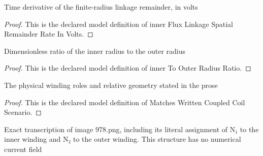 \begin{definition}
  \label{def:physics:phyx-mini-0978:phyxminiproblems-problemphyxmini0978-innerfluxlinkagespatialremainderrateinvolts}
  Time derivative of the finite-radius linkage remainder, in volts
\end{definition}
\begin{proof}
  This is the declared model definition of inner Flux Linkage Spatial Remainder Rate In Volts.
\end{proof}
\begin{definition}
  \label{def:physics:phyx-mini-0978:phyxminiproblems-problemphyxmini0978-innertoouterradiusratio}
  Dimensionless ratio of the inner radius to the outer radius
\end{definition}
\begin{proof}
  This is the declared model definition of inner To Outer Radius Ratio.
\end{proof}
\begin{definition}
  \label{def:physics:phyx-mini-0978:phyxminiproblems-problemphyxmini0978-matcheswrittencoupledcoilscenario}
  The physical winding roles and relative geometry stated in the prose
\end{definition}
\begin{proof}
  This is the declared model definition of Matches Written Coupled Coil Scenario.
\end{proof}
\begin{definition}
  \label{def:physics:phyx-mini-0978:phyxminiproblems-problemphyxmini0978-matchesprimarycoupledcoilfigure}
  Exact transcription of image 978.png, including its literal assignment of N₁ to the inner winding and N₂ to the outer winding. This structure has no numerical current field
\end{definition}
